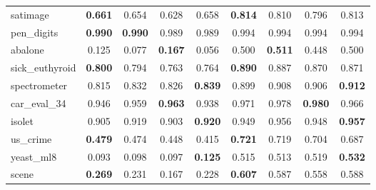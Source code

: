 \begin{figure}[ht]
\begin{tabular}{p{22mm}|*4{p{14mm}}|*4{p{14mm}}}
        satimage&\multicolumn{1}{c}{\textbf{0.661}}&\multicolumn{1}{c}{0.654}&\multicolumn{1}{c}{0.628}&\multicolumn{1}{c|}{0.658}&\multicolumn{1}{c}{\textbf{0.814}}&\multicolumn{1}{c}{0.810}&\multicolumn{1}{c}{0.796}&\multicolumn{1}{c}{0.813}\\
        pen\_digits&\multicolumn{1}{c}{\textbf{0.990}}&\multicolumn{1}{c}{\textbf{0.990}}&\multicolumn{1}{c}{0.989}&\multicolumn{1}{c|}{0.989}&\multicolumn{1}{c}{0.994}&\multicolumn{1}{c}{0.994}&\multicolumn{1}{c}{0.994}&\multicolumn{1}{c}{0.994}\\
        abalone&\multicolumn{1}{c}{0.125}&\multicolumn{1}{c}{0.077}&\multicolumn{1}{c}{\textbf{0.167}}&\multicolumn{1}{c|}{0.056}&\multicolumn{1}{c}{0.500}&\multicolumn{1}{c}{\textbf{0.511}}&\multicolumn{1}{c}{0.448}&\multicolumn{1}{c}{0.500}\\
        sick\_euthyroid&\multicolumn{1}{c}{\textbf{0.800}}&\multicolumn{1}{c}{0.794}&\multicolumn{1}{c}{0.763}&\multicolumn{1}{c|}{0.764}&\multicolumn{1}{c}{\textbf{0.890}}&\multicolumn{1}{c}{0.887}&\multicolumn{1}{c}{0.870}&\multicolumn{1}{c}{0.871}\\
        spectrometer&\multicolumn{1}{c}{0.815}&\multicolumn{1}{c}{0.832}&\multicolumn{1}{c}{0.826}&\multicolumn{1}{c|}{\textbf{0.839}}&\multicolumn{1}{c}{0.899}&\multicolumn{1}{c}{0.908}&\multicolumn{1}{c}{0.906}&\multicolumn{1}{c}{\textbf{0.912}}\\
        car\_eval\_34&\multicolumn{1}{c}{0.946}&\multicolumn{1}{c}{0.959}&\multicolumn{1}{c}{\textbf{0.963}}&\multicolumn{1}{c|}{0.938}&\multicolumn{1}{c}{0.971}&\multicolumn{1}{c}{0.978}&\multicolumn{1}{c}{\textbf{0.980}}&\multicolumn{1}{c}{0.966}\\
        isolet&\multicolumn{1}{c}{0.905}&\multicolumn{1}{c}{0.919}&\multicolumn{1}{c}{0.903}&\multicolumn{1}{c|}{\textbf{0.920}}&\multicolumn{1}{c}{0.949}&\multicolumn{1}{c}{0.956}&\multicolumn{1}{c}{0.948}&\multicolumn{1}{c}{\textbf{0.957}}\\
        us\_crime&\multicolumn{1}{c}{\textbf{0.479}}&\multicolumn{1}{c}{0.474}&\multicolumn{1}{c}{0.448}&\multicolumn{1}{c|}{0.415}&\multicolumn{1}{c}{\textbf{0.721}}&\multicolumn{1}{c}{0.719}&\multicolumn{1}{c}{0.704}&\multicolumn{1}{c}{0.687}\\
        yeast\_ml8&\multicolumn{1}{c}{0.093}&\multicolumn{1}{c}{0.098}&\multicolumn{1}{c}{0.097}&\multicolumn{1}{c|}{\textbf{0.125}}&\multicolumn{1}{c}{0.515}&\multicolumn{1}{c}{0.513}&\multicolumn{1}{c}{0.519}&\multicolumn{1}{c}{\textbf{0.532}}\\
        scene&\multicolumn{1}{c}{\textbf{0.269}}&\multicolumn{1}{c}{0.231}&\multicolumn{1}{c}{0.167}&\multicolumn{1}{c|}{0.228}&\multicolumn{1}{c}{\textbf{0.607}}&\multicolumn{1}{c}{0.587}&\multicolumn{1}{c}{0.558}&\multicolumn{1}{c}{0.588}\\

\end{tabular}
\end{figure}
